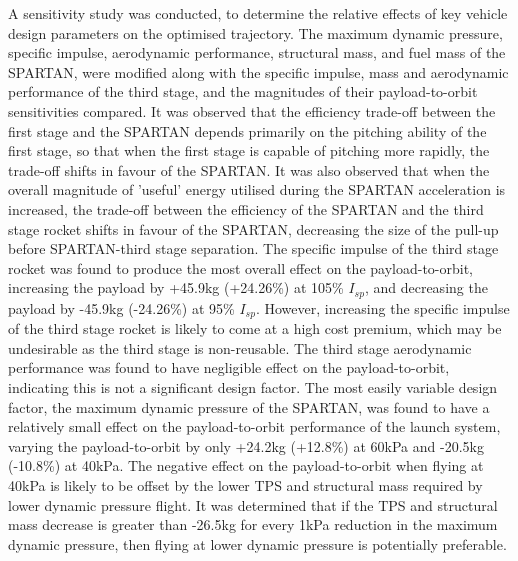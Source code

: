 A sensitivity study was conducted, to determine the relative effects of key vehicle design parameters on the optimised trajectory. 
The maximum dynamic pressure, specific impulse, aerodynamic performance, structural mass, and fuel mass of the SPARTAN, were modified along with the specific impulse, mass and aerodynamic performance of the third stage, and the magnitudes of their payload-to-orbit sensitivities compared. 
It was observed that the efficiency trade-off between the first stage and the SPARTAN depends primarily on the pitching ability of the first stage, so that when the first stage is capable of pitching more rapidly, the trade-off shifts in favour of the SPARTAN. 
It was also observed that when the overall magnitude of 'useful' energy utilised during the SPARTAN acceleration is increased, the trade-off between the efficiency of the SPARTAN and the third stage rocket shifts in favour of the SPARTAN, decreasing the size of the pull-up before SPARTAN-third stage separation. 
The specific impulse of the third stage rocket was found to produce the most overall effect on the payload-to-orbit, increasing the payload by +45.9kg (+24.26\%) at 105\% $I_{sp}$, and decreasing the payload by -45.9kg (-24.26\%) at 95\% $I_{sp}$. However, increasing the specific impulse of the third stage rocket is likely to come at a high cost premium, which may be undesirable as the third stage is non-reusable. 
The third stage aerodynamic performance was found to have negligible effect on the payload-to-orbit, indicating this is not a significant design factor. 
The most easily variable design factor, the maximum dynamic pressure of the SPARTAN, was found to have a relatively small effect on the payload-to-orbit performance of the launch system, varying the payload-to-orbit by only +24.2kg (+12.8\%) at 60kPa and -20.5kg (-10.8\%) at 40kPa. The negative effect on the payload-to-orbit when flying at 40kPa is likely to be offset by the lower TPS and structural mass required by lower dynamic pressure flight. It was determined that if the TPS and structural mass decrease is greater than -26.5kg for every 1kPa reduction in the maximum dynamic pressure, then flying at lower dynamic pressure is potentially preferable. 







